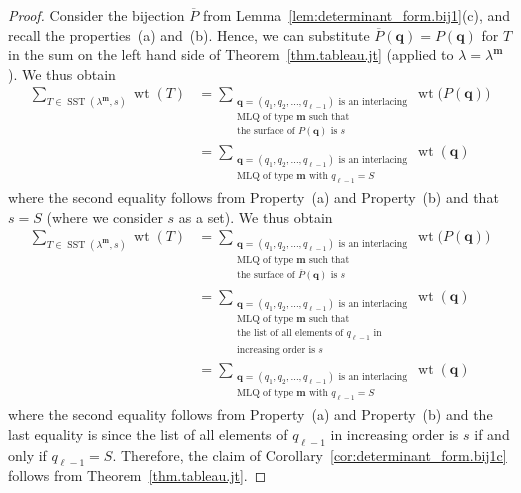 \documentclass[reqno]{amsart}
\newcommand{\0}{\phantom{c}}
\DeclareMathOperator{\wt}{wt} %
\DeclareMathOperator{\SST}{SST} %
\newcommand{\mm}{\mathbf{m}}
\newcommand{\qq}{\mathbf{q}}
\let\sumnonlimits\sum
\renewcommand{\sum}{\sumnonlimits\limits}
\newenvironment{verlong}{}{}
\newenvironment{vershort}{}{}
\newcommand{\tup}[1]{\left( #1 \right)}
\theoremstyle{plain}
\theoremstyle{definition}
\numberwithin{equation}{section}
\begin{document}
\begin{proof}
Consider the bijection $\overline{P}$ from Lemma~\ref{lem:determinant_form.bij1}(c), and recall the properties~(a) and~(b).
Hence, we can substitute $\overline{P}(\qq) = P(\qq)$ for $T$ in the sum on the left hand side of Theorem~\ref{thm.tableau.jt} (applied to $\lambda = \lambda^{\mm}$).
\begin{vershort}
We thus obtain
\begin{align*}
\sum_{T \in \SST(\lambda^{\mm}, s)} \wt(T)
  & = \sum_{\substack{\qq=\tup{q_1, q_2, \dotsc, q_{\ell-1}} \text{ is an interlacing}\\\text{MLQ of type } \mm \text{ such that} \\\text{the surface of }P(\qq) \text{ is } s}} \wt\bigl(  P(\qq) \bigr) \\
&  = \sum_{\substack{\qq = \tup{q_1,q_2,\dotsc,q_{\ell-1}} \text{ is an interlacing}\\\text{MLQ of type } \mm \text{ with } q_{\ell-1} = S}} \wt(\qq)
\end{align*}
where the second equality follows from Property~(a) and Property~(b) and that $s = S$ (where we consider $s$ as a set).
\end{vershort}
\begin{verlong}
We thus obtain
\begin{align*}
\sum_{T \in \SST(\lambda^{\mm}, s)} \wt(T)
  & = \sum_{\substack{\qq=\tup{q_1, q_2, \dotsc, q_{\ell-1}} \text{ is an interlacing}\\\text{MLQ of type } \mm \text{ such that} \\\text{the surface of } \overline{P}(\qq) \text{ is } s}} \wt\bigl(  P(\qq) \bigr) \\
&  = \sum_{\substack{\qq= \tup{q_1, q_2, \dotsc,q_{\ell-1}} \text{ is an interlacing}\\\text{MLQ of type } \mm \text{ such that}\\\text{the list of all elements of } q_{\ell-1} \text{ in} \\\text{increasing order is } s}} \wt(\qq) \\
&  = \sum_{\substack{\qq = \tup{q_1,q_2,\dotsc,q_{\ell-1}} \text{ is an interlacing}\\\text{MLQ of type } \mm \text{ with } q_{\ell-1} = S}} \wt(\qq)
\end{align*}
where the second equality follows from Property~(a) and Property~(b) and the last equality is since the list of all elements of $q_{\ell-1}$ in increasing order is $s$ if and only if $q_{\ell-1}=S$.
\end{verlong}
Therefore, the claim of Corollary~\ref{cor:determinant_form.bij1c} follows from Theorem~\ref{thm.tableau.jt}.
\end{proof}
\end{document}
